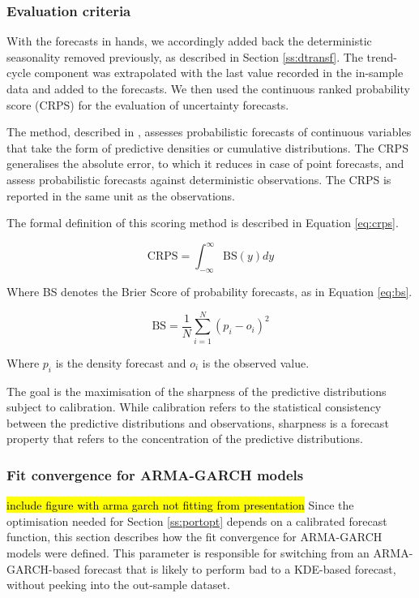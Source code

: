 \documentclass[review, 3p, 12pt, authoryear]{elsarticle}
\begin{document}
\subsubsection{Evaluation criteria}
\label{sss:eval}
With the forecasts in hands, we accordingly added back the deterministic seasonality removed previously, as described in Section \ref{ss:dtransf}.
The trend-cycle component was extrapolated with the last value recorded in the in-sample data and added to the forecasts.
We then used the continuous ranked probability score (CRPS) for the evaluation of uncertainty forecasts.

The method, described in \citet{GBR2007crps}, assesses probabilistic forecasts of continuous variables that take the form of predictive densities or cumulative distributions.
The CRPS generalises the absolute error, to which it reduces in case of point forecasts, and assess probabilistic forecasts against deterministic observations.
The CRPS is reported in the same unit as the observations.

The formal definition of this scoring method is described in Equation \ref{eq:crps}.

\begin{equation}
   \text{CRPS} = \int_{-\infty}^{\infty} \text{BS}(y) dy
   \label{eq:crps}
\end{equation}

Where BS denotes the Brier Score \citep{brier1950verification} of probability forecasts, as in Equation \ref{eq:bs}.

\begin{equation}
   \text{BS} = \frac{1}{N} \sum_{i=1}^N {(p_i - o_i)}^2
   \label{eq:bs}
\end{equation}

Where $p_i$ is the density forecast and $o_i$ is the observed value.

The goal is the maximisation of the sharpness of the predictive distributions subject to calibration.
While calibration refers to the statistical consistency between the predictive distributions and observations, sharpness is a forecast property that refers to the concentration of the predictive distributions.

\subsubsection{Fit convergence for ARMA-GARCH models}
\label{sss:gof.min}
\hl{include figure with arma garch not fitting from presentation}
Since the optimisation needed for Section \ref{ss:portopt} depends on a calibrated forecast function, this section describes how the fit convergence for ARMA-GARCH models were defined.
This parameter is responsible for switching from an ARMA-GARCH-based forecast that is likely to perform bad to a KDE-based forecast, without peeking into the out-sample dataset.
\end{document}
